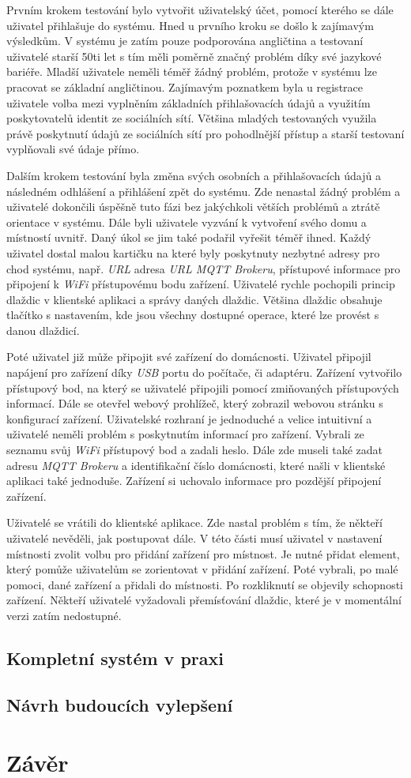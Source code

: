 Prvním krokem testování bylo vytvořit uživatelský účet, pomocí kterého se dále uživatel přihlašuje do systému.
Hned u prvního kroku se došlo k zajímavým výsledkům.
V systému je zatím pouze podporována angličtina a testovaní uživatelé starší 50ti let s tím měli poměrně značný problém díky své jazykové bariéře.
Mladší uživatele neměli téměř žádný problém, protože v systému lze pracovat se základní angličtinou.
Zajímavým poznatkem byla u registrace uživatele volba mezi vyplněním základních přihlašovacích údajů a využitím poskytovatelů identit ze sociálních sítí.
Většina mladých testovaných využila právě poskytnutí údajů ze sociálních sítí pro pohodlnější přístup a starší testovaní vyplňovali své údaje přímo.

Dalším krokem testování byla změna svých osobních a přihlašovacích údajů a následném odhlášení a přihlášení zpět do systému.
Zde nenastal žádný problém a uživatelé dokončili úspěšně tuto fázi bez jakýchkoli větších problémů a ztrátě orientace v systému.
\newpage
Dále byli uživatele vyzvání k vytvoření svého domu a místností uvnitř.
Daný úkol se jim také podařil vyřešit téměř ihned.
Každý uživatel dostal malou kartičku na které byly poskytnuty nezbytné adresy pro chod systému, např. \emph{URL} adresa \emph{URL MQTT Brokeru}, přístupové informace pro připojení k \emph{WiFi} přístupovému bodu zařízení.
Uživatelé rychle pochopili princip dlaždic v klientské aplikaci a správy daných dlaždic.
Většina dlaždic obsahuje tlačítko s nastavením, kde jsou všechny dostupné operace, které lze provést s danou dlaždicí.

Poté uživatel již může připojit své zařízení do domácnosti.
Uživatel připojil napájení pro zařízení díky \emph{USB} portu do počítače, či adaptéru.
Zařízení vytvořilo přístupový bod, na který se uživatelé připojili pomocí zmiňovaných přístupových informací.
Dále se otevřel webový prohlížeč, který zobrazil webovou stránku s konfigurací zařízení.
Uživatelské rozhraní je jednoduché a velice intuitivní a uživatelé neměli problém s poskytnutím informací pro zařízení.
Vybrali ze seznamu svůj \emph{WiFi} přístupový bod a zadali heslo.
Dále zde museli také zadat adresu \emph{MQTT Brokeru} a identifikační číslo domácnosti, které našli v klientské aplikaci také jednoduše.
Zařízení si uchovalo informace pro pozdější připojení zařízení.

Uživatelé se vrátili do klientské aplikace.
Zde nastal problém s tím, že někteří uživatelé nevěděli, jak postupovat dále.
V této části musí uživatel v nastavení místnosti zvolit volbu pro přidání zařízení pro místnost.
Je nutné přidat element, který pomůže uživatelům se zorientovat v přidání zařízení.
Poté vybrali, po malé pomoci, dané zařízení a přidali do místnosti.
Po rozkliknutí se objevily schopnosti zařízení.
Někteří uživatelé vyžadovali přemísťování dlaždic, které je v momentální verzi zatím nedostupné.


\section{Kompletní systém v praxi}
\label{testovani:praxe}

\section{Návrh budoucích vylepšení}
\label{testovani:praxe}


\chapter{Závěr}
\label{zaver}